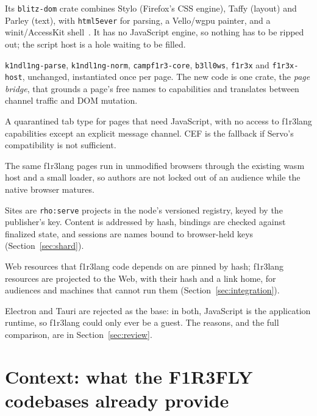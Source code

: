 \documentclass[11pt]{article}
\theoremstyle{definition}
\theoremstyle{remark}
\newcommand{\fl}{f1r3lang}
\newcommand{\Camp}{CampF1R3}
\newcommand{\code}[1]{\texttt{#1}}
\begin{document}
\begin{description}[nosep,leftmargin=1.5em,style=nextline]
\item[Document engine: Blitz.] Its \code{blitz-dom} crate combines Stylo (Firefox's
  CSS engine), Taffy (layout) and Parley (text), with \code{html5ever} for parsing,
  a Vello/wgpu painter, and a winit/AccessKit shell~\cite{blitz}. It has no
  JavaScript engine, so nothing has to be ripped out; the script host is a hole
  waiting to be filled.
\item[Execution: the \Camp{} executive.] \code{k1ndl1ng-parse},
  \code{k1ndl1ng-norm}, \code{campf1r3-core}, \code{b3ll0ws}, \code{f1r3x} and
  \code{f1r3x-host}, unchanged, instantiated once per page. The new code is one
  crate, the \emph{page bridge}, that grounds a page's free names to capabilities
  and translates between channel traffic and DOM mutation.
\item[Legacy web: Servo, out of process.] A quarantined tab type for pages that
  need JavaScript, with no access to \fl{} capabilities except an explicit message
  channel. CEF is the fallback if Servo's compatibility is not sufficient.
\item[Reach: \code{f1r3x-wasm}.] The same \fl{} pages run in unmodified browsers
  through the existing wasm host and a small loader, so authors are not locked out
  of an audience while the native browser matures.
\item[Server: a F1R3FLY shard.] Sites are \code{rho:serve} projects in the
  node's versioned registry, keyed by the publisher's key. Content is addressed by hash,
  bindings are checked against finalized state, and sessions are names bound to
  browser-held keys (Section~\ref{sec:shard}).
\item[Integration: pin and project.] Web resources that \fl{} code depends on are pinned
  by hash; \fl{} resources are projected to the Web, with their hash and a link home,
  for audiences and machines that cannot run them (Section~\ref{sec:integration}).
\end{description}

\noindent
Electron and Tauri are rejected as the base: in both, JavaScript is the application
runtime, so \fl{} could only ever be a guest. The reasons, and the full comparison,
are in Section~\ref{sec:review}.

\section{Context: what the F1R3FLY codebases already provide}\label{sec:context}
\end{document}
